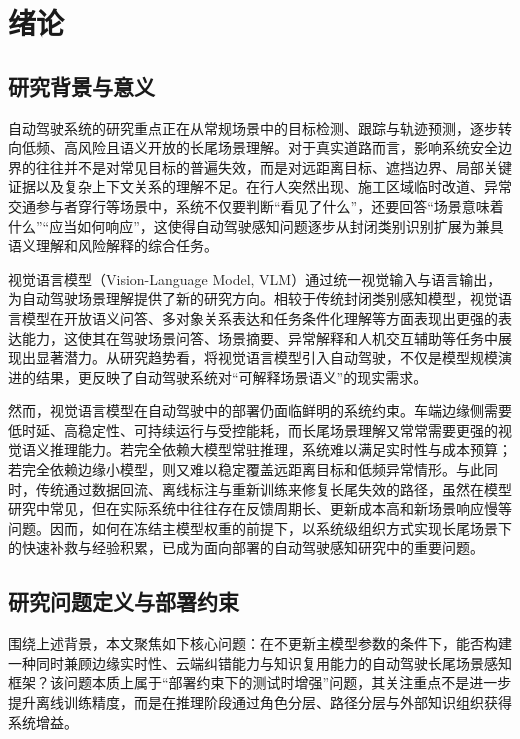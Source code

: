 
\chapter{绪论}
\label{cha:introduction}

\section{研究背景与意义}
\label{sec:intro-background}

自动驾驶系统的研究重点正在从常规场景中的目标检测、跟踪与轨迹预测，逐步转向低频、高风险且语义开放的长尾场景理解。对于真实道路而言，影响系统安全边界的往往并不是对常见目标的普遍失效，而是对远距离目标、遮挡边界、局部关键证据以及复杂上下文关系的理解不足\cite{caesar2020nuscenes,dosovitskiy2017carla,liu2024surveyadatasets,kaur2021surveyselfdrivingsimulators}。在行人突然出现、施工区域临时改道、异常交通参与者穿行等场景中，系统不仅要判断“看见了什么”，还要回答“场景意味着什么”“应当如何响应”，这使得自动驾驶感知问题逐步从封闭类别识别扩展为兼具语义理解和风险解释的综合任务。

视觉语言模型（Vision-Language Model, VLM）通过统一视觉输入与语言输出，为自动驾驶场景理解提供了新的研究方向。相较于传统封闭类别感知模型，视觉语言模型在开放语义问答、多对象关系表达和任务条件化理解等方面表现出更强的表达能力，这使其在驾驶场景问答、场景摘要、异常解释和人机交互辅助等任务中展现出显著潜力\cite{marcu2024lingoqa,sima2024drivelm,guo2024drivemllm,wang2024omnidrive}。从研究趋势看，将视觉语言模型引入自动驾驶，不仅是模型规模演进的结果，更反映了自动驾驶系统对“可解释场景语义”的现实需求。

然而，视觉语言模型在自动驾驶中的部署仍面临鲜明的系统约束。车端边缘侧需要低时延、高稳定性、可持续运行与受控能耗，而长尾场景理解又常常需要更强的视觉语义推理能力。若完全依赖大模型常驻推理，系统难以满足实时性与成本预算；若完全依赖边缘小模型，则又难以稳定覆盖远距离目标和低频异常情形。与此同时，传统通过数据回流、离线标注与重新训练来修复长尾失效的路径，虽然在模型研究中常见，但在实际系统中往往存在反馈周期长、更新成本高和新场景响应慢等问题。因而，如何在冻结主模型权重的前提下，以系统级组织方式实现长尾场景下的快速补救与经验积累，已成为面向部署的自动驾驶感知研究中的重要问题。

\section{研究问题定义与部署约束}
\label{sec:intro-problem}

围绕上述背景，本文聚焦如下核心问题：在不更新主模型参数的条件下，能否构建一种同时兼顾边缘实时性、云端纠错能力与知识复用能力的自动驾驶长尾场景感知框架？该问题本质上属于“部署约束下的测试时增强”问题，其关注重点不是进一步提升离线训练精度，而是在推理阶段通过角色分层、路径分层与外部知识组织获得系统增益。


